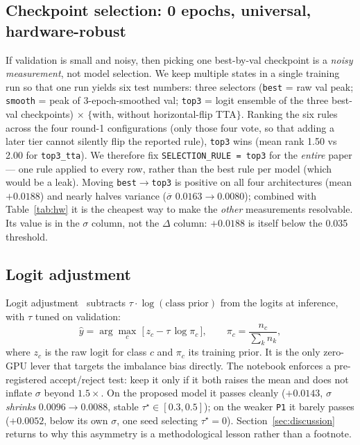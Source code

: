 \documentclass[11pt,a4paper]{article}
\begin{document}
\subsection{Checkpoint selection: 0 epochs, universal, hardware-robust}
\label{sec:ckpt}
If validation is small and noisy, then picking one best-by-val checkpoint is a
\emph{noisy measurement}, not model selection. We keep multiple states in a
single training run so that one run yields six test numbers: three selectors
(\texttt{best} = raw val peak; \texttt{smooth} = peak of 3-epoch-smoothed val;
\texttt{top3} = logit ensemble of the three best-val checkpoints) $\times$
$\{$with, without horizontal-flip TTA$\}$. Ranking the six rules across the four
round-1 configurations (only those four vote, so that adding a later tier cannot
silently flip the reported rule), \texttt{top3} wins (mean rank 1.50 vs 2.00 for
\texttt{top3\_tta}). We therefore fix \texttt{SELECTION\_RULE = top3} for the
\emph{entire} paper --- one rule applied to every row, rather than the best rule
per model (which would be a leak). Moving \texttt{best}$\to$\texttt{top3} is
positive on all four architectures (mean $+0.0188$) and nearly halves variance
($\overline\sigma$ $0.0163\to0.0080$); combined with Table~\ref{tab:hw} it is
the cheapest way to make the \emph{other} measurements resolvable. Its value is
in the $\sigma$ column, not the $\Delta$ column: $+0.0188$ is itself below the
0.035 threshold.

\subsection{Logit adjustment}
\label{sec:logit}
Logit adjustment~\cite{logitadj} subtracts $\tau\cdot\log(\text{class prior})$
from the logits at inference, with $\tau$ tuned on validation:
\begin{equation}
\hat y = \arg\max_{c}\;\big[\, z_c - \tau\,\log \pi_c \,\big],\qquad
\pi_c=\frac{n_c}{\sum_{k}n_k},
\end{equation}
where $z_c$ is the raw logit for class $c$ and $\pi_c$ its training prior. It is
the only zero-GPU lever that targets the imbalance bias directly. The notebook
enforces a pre-registered accept/reject test: keep it only if it both raises the
mean and does not inflate $\sigma$ beyond $1.5\times$. On the proposed model it
passes cleanly ($+0.0143$, $\sigma$ \emph{shrinks} $0.0096\to0.0088$, stable
$\tau^\star\in[0.3,0.5]$); on the weaker \texttt{P1} it barely passes
($+0.0052$, below its own $\sigma$, one seed selecting $\tau^\star=0$).
Section~\ref{sec:discussion} returns to why this asymmetry is a methodological
lesson rather than a footnote.
\end{document}
